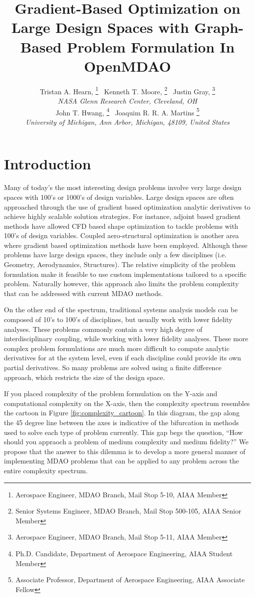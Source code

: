\documentclass[]{aiaa-tc} %
\title{Gradient-Based Optimization on Large Design Spaces with Graph-Based Problem Formulation In OpenMDAO}
\author{
  Tristan A. Hearn,%
     \thanks{Aerospace Engineer, MDAO Branch, Mail Stop 5-10, AIAA Member}
  \ Kenneth T. Moore,%
     \thanks{Senior Systems Engineer, MDAO Branch, Mail Stop 500-105, AIAA Senior Member}
  \ Justin Gray,%
     \thanks{Aerospace Engineer, MDAO Branch, Mail Stop 5-11, AIAA Member}
   \\
  {\normalsize\itshape
  NASA Glenn Research Center, Cleveland, OH}  \\
  John T. Hwang,%
  \thanks{Ph.D. Candidate, Department of Aerospace Engineering, AIAA Student Member}
  \ Joaquim R. R. A. Martins%
  \thanks{Associate Professor, Department of Aerospace Engineering, AIAA Associate Fellow}
  \\
  {\normalsize\itshape
   University of Michigan, Ann Arbor, Michigan, 48109, United States}
}
\begin{document}
  \maketitle

  \begin{abstract}

  \end{abstract}

  \section{Introduction}

    Many of today's the most interesting design problems involve very large design spaces with 100's or 1000's of
    design variables. Large design spaces are often approached through the use of gradient based optimization
    analytic derivatives to achieve highly scalable solution strategies. For instance, adjoint based gradient
    methods have allowed CFD based shape optimization to tackle problems with 100's of design variables\cite{SU2_2013}. 
    Coupled aero-structural optimization is another area where gradient based optimization methods have
    been employed\cite{Kenway2012c, Haghighat:2011:ADO}. Although these problems have large design spaces,
    they include only a few disciplines (i.e. Geometry, Aerodynamics, Structures). The relative simplicity of
    the problem formulation make it feasible to use custom implementations tailored to a specific problem. Naturally however,
    this approach also limits the problem complexity that can be addressed with current MDAO methods.

    On the other end of the spectrum, traditional systems analysis models can be composed of 10's to 100's of disciplines,
    but usually work with lower fidelity analyses. These problems commonly contain a very high degree of interdisciplinary
    coupling, while working with lower fidelity analyses. These more complex problem formulations are much more difficult to compute
    analytic derivatives for at the system level, even if each discipline could provide its own partial derivatives. So many
    problems are solved using a finite difference approach, which restricts the size of the design space.

    If you placed complexity of the problem formulation on the Y-axis and computational complexity on the X-axis, then 
    the complexity spectrum resembles the cartoon in Figure \ref{fig:complexity_cartoon}. 
    In this diagram, the gap along the 45 degree line between the axes is indicative of the bifurcation 
    in methods used to solve each type of problem currently. This gap begs the
    question, ``How should you appraoch a problem of medium complexity and medium fidelity?'' 
    We propose that the answer to this dilemma is to develop a more general manner of 
    implementing MDAO problems that can be applied to any problem across the entire complexity spectrum. 
\end{document}
